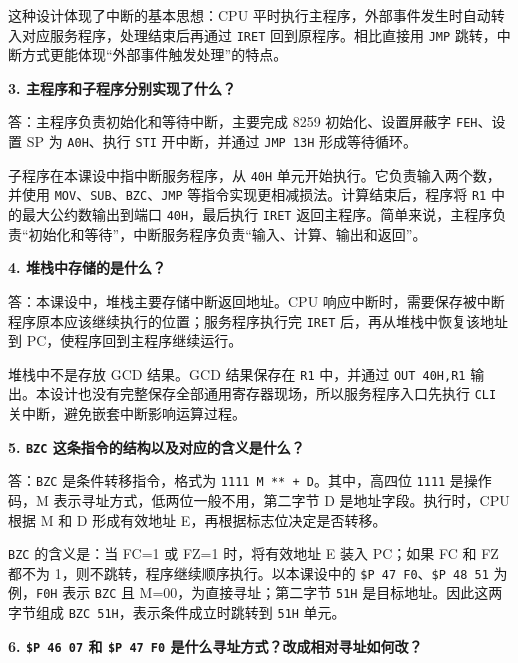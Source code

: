 \documentclass[UTF8,12pt,a4paper]{ctexart}
\newcommand{\hex}[1]{\texttt{#1H}}
\newcommand{\reg}[1]{\texttt{#1}}
\newcommand{\inst}[1]{\texttt{#1}}
\newcommand{\prog}[1]{\texttt{\$P #1}}
\begin{document}
这种设计体现了中断的基本思想：CPU 平时执行主程序，外部事件发生时自动转入对应服务程序，处理结束后再通过 \inst{IRET} 回到原程序。相比直接用 \inst{JMP} 跳转，中断方式更能体现“外部事件触发处理”的特点。

\vspace{0.7em}

\textbf{3. 主程序和子程序分别实现了什么？}

答：主程序负责初始化和等待中断，主要完成 8259 初始化、设置屏蔽字 \hex{FE}、设置 SP 为 \hex{A0}、执行 \inst{STI} 开中断，并通过 \inst{JMP 13H} 形成等待循环。

子程序在本课设中指中断服务程序，从 \hex{40} 单元开始执行。它负责输入两个数，并使用 \inst{MOV}、\inst{SUB}、\inst{BZC}、\inst{JMP} 等指令实现更相减损法。计算结束后，程序将 \reg{R1} 中的最大公约数输出到端口 \hex{40}，最后执行 \inst{IRET} 返回主程序。简单来说，主程序负责“初始化和等待”，中断服务程序负责“输入、计算、输出和返回”。

\vspace{0.7em}

\textbf{4. 堆栈中存储的是什么？}

答：本课设中，堆栈主要存储中断返回地址。CPU 响应中断时，需要保存被中断程序原本应该继续执行的位置；服务程序执行完 \inst{IRET} 后，再从堆栈中恢复该地址到 PC，使程序回到主程序继续运行。

堆栈中不是存放 GCD 结果。GCD 结果保存在 \reg{R1} 中，并通过 \inst{OUT 40H,R1} 输出。本设计也没有完整保存全部通用寄存器现场，所以服务程序入口先执行 \inst{CLI} 关中断，避免嵌套中断影响运算过程。

\vspace{0.7em}

\textbf{5. \inst{BZC} 这条指令的结构以及对应的含义是什么？}

答：\inst{BZC} 是条件转移指令，格式为 \texttt{1111 M ** + D}。其中，高四位 \texttt{1111} 是操作码，M 表示寻址方式，低两位一般不用，第二字节 D 是地址字段。执行时，CPU 根据 M 和 D 形成有效地址 E，再根据标志位决定是否转移。

\inst{BZC} 的含义是：当 FC=1 或 FZ=1 时，将有效地址 E 装入 PC；如果 FC 和 FZ 都不为 1，则不跳转，程序继续顺序执行。以本课设中的 \prog{47 F0}、\prog{48 51} 为例，\hex{F0} 表示 \inst{BZC} 且 M=00，为直接寻址；第二字节 \hex{51} 是目标地址。因此这两字节组成 \inst{BZC 51H}，表示条件成立时跳转到 \hex{51} 单元。

\vspace{0.7em}

\textbf{6. \prog{46 07} 和 \prog{47 F0} 是什么寻址方式？改成相对寻址如何改？}
\end{document}
